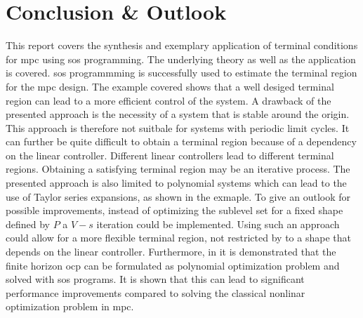 \documentclass[10pt,a4paper]{article}
\begin{document}
\section{Conclusion \& Outlook}
\label{sec:conclusion}

This report covers the synthesis and exemplary application of terminal conditions for \gls{mpc} using \gls{sos} programming. The underlying theory as well as the 
application is covered. \gls{sos} programmming is successfully used to estimate the terminal region for the \gls{mpc} design. The example covered shows that a 
well desiged terminal region can lead to a more efficient control of the system. A drawback of the presented approach is the necessity of a system that is 
stable around the origin. This approach is therefore not suitbale for systems with periodic limit cycles. It can further be quite difficult to obtain a 
terminal region because of a dependency on the linear controller. Different linear controllers lead to different terminal regions. Obtaining a satisfying terminal
region may be an iterative process. The presented approach is also limited to polynomial systems which can lead to the use of Taylor series expansions, as 
shown in the exmaple. To give an outlook for possible improvements, instead of optimizing the sublevel set for a fixed shape defined by $P$ a $V-s$ iteration could be implemented. 
Using such an approach could allow for a more flexible terminal region, not restricted by to a shape that depends on the linear controller. Furthermore, in \cite{RaffAllgoewer} it is demonstrated that the finite horizon \gls{ocp} can be formulated as polynomial optimization problem and solved with \gls{sos} programs.
It is shown that this can lead to significant performance improvements compared to solving the classical nonlinar optimization problem in \gls{mpc}. 




\pagebreak




\end{document}
